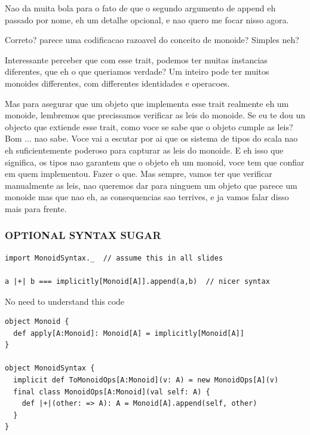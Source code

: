 \documentclass{beamer}
\begin{document}
\begin{frame}[fragile]
{    Nao da muita bola para o fato de que o segundo argumento de append eh
    passado por nome, eh um detalhe opcional, e nao quero me focar nisso agora.

    Correto? parece uma codificacao razoavel do conceito de monoide? Simples neh?

  \hrulefill

    Interessante perceber que com esse trait, podemos ter muitas instancias
    diferentes, que eh o que queriamos verdade? Um inteiro pode ter muitos
    monoides differentes, com differentes identidades e operacoes.

    Mas para asegurar que um objeto que implementa esse trait realmente eh um
    monoide, lembremos que precissamos verificar as leis do monoide. Se eu te
    dou un objecto que extiende esse trait, como voce se sabe que o objeto
    cumple as leis? Bom ... nao sabe. Voce vai a escutar por ai que os sistema
    de tipos do scala nao eh suficientemente poderoso para capturar as leis do
    monoide. E eh isso que significa, os tipos nao garantem que o objeto eh um
    monoid, voce tem que confiar em quem implementou. Fazer o que. Mas sempre,
    vamos ter que verificar manualmente as leis, nao queremos dar para ninguem
    um objeto que parece um monoide mas que nao eh, as consequencias sao
    terrives, e ja vamos falar disso mais para frente.
  }
\end{frame}

\begin{frame}[fragile]\frametitle{OPTIONAL SYNTAX SUGAR}
  \begin{block}{}
  \begin{lstlisting}
import MonoidSyntax._  // assume this in all slides

a |+| b === implicitly[Monoid[A]].append(a,b)  // nicer syntax
  \end{lstlisting}
  \end{block}

  \begin{block}{No need to understand this code}
  \begin{lstlisting}
object Monoid {
  def apply[A:Monoid]: Monoid[A] = implicitly[Monoid[A]]
}

object MonoidSyntax {
  implicit def ToMonoidOps[A:Monoid](v: A) = new MonoidOps[A](v)
  final class MonoidOps[A:Monoid](val self: A) {
    def |+|(other: => A): A = Monoid[A].append(self, other)
  }
}
  \end{lstlisting}
  \end{block}
\end{frame}
\end{document}
